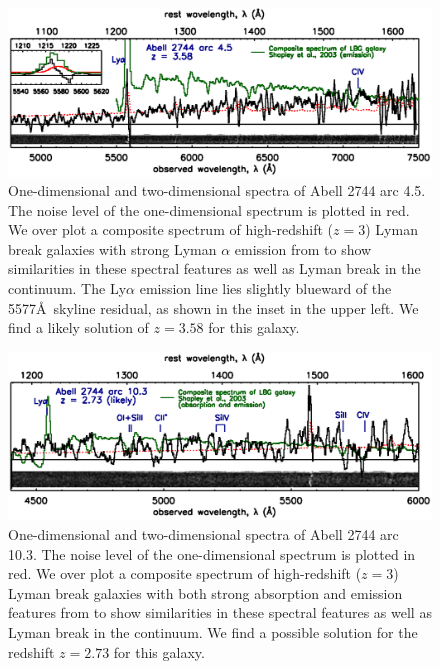 \newpage
\begin{figure}[h]
\includegraphics[width=\textwidth]{Chap2/c2f18.eps}
\caption[Abell 2744, arc 4.5 spectrum]{One-dimensional and two-dimensional spectra of Abell 2744 arc 4.5. The noise level of the one-dimensional spectrum is plotted in red. We over plot a composite spectrum of high-redshift ($z=3$) Lyman break galaxies with strong Lyman $\alpha$ emission from \citet{Shapley:2003fk} to show similarities in these spectral features as well as Lyman break in the continuum. The Ly$\alpha$ emission line lies slightly blueward of the 5577\AA\ skyline residual, as shown in the inset in the upper left. We find a likely solution of $z=3.58$ for this galaxy.}
\label{app:fig:a2744_spec4}
\end{figure}

\begin{figure}[h]
\includegraphics[width=\textwidth]{Chap2/c2f19.eps}
\caption[Abell 2744, arc 10.3 spectrum]{One-dimensional and two-dimensional spectra of Abell 2744 arc 10.3. The noise level of the one-dimensional spectrum is plotted in red. We over plot a composite spectrum of high-redshift ($z=3$) Lyman break galaxies with both strong absorption and emission features from \citet{Shapley:2003fk} to show similarities in these spectral features as well as Lyman break in the continuum. We find a possible solution for the redshift $z=2.73$ for this galaxy.}
\label{app:fig:a2744_spec10}
\end{figure}
